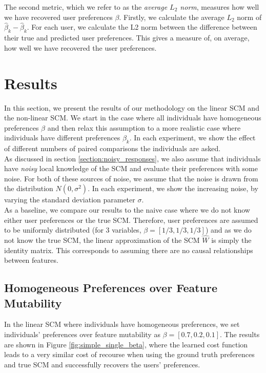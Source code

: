 \bigskip

The second metric, which we refer to as the \textit{average $L_2$ norm}, measures how well we have recovered user preferences $\beta$. Firstly, we calculate the average $L_2$ norm of $\hat{\beta}_k - \hat{\beta}_k$. For each user, we calculate the L2 norm between the difference between their true and predicted user preferences. This gives a measure of, on average, how well we have recovered the user preferences. \\

\section{Results}

In this section, we present the results of our methodology on the linear SCM and the non-linear SCM. We start in the case where all individuals have homogeneous preferences $\beta$ and then relax this assumption to a more realistic case where individuals have different preferences $\beta_k$. In each experiment, we show the effect of different numbers of paired comparisons the individuals are asked. \\

As discussed in section \ref{section:noisy_responses}, we also assume that individuals have \textit{noisy} local knowledge of the SCM and evaluate their preferences with some noise. For both of these sources of noise, we assume that the noise is drawn from the distribution $N(0, \sigma^2)$. In each experiment, we show the increasing noise, by varying the standard deviation parameter $\sigma$. \\

As a baseline, we compare our results to the naive case where we do not know either user preferences or the true SCM. Therefore, user preferences are assumed to be uniformly distributed (for 3 variables, $\beta = [1/3, 1/3, 1/3]$) and as we do not know the true SCM, the linear approximation of the SCM $\hat{W}$ is simply the identity matrix. This corresponds to assuming there are no causal relationships between features.

\subsection{Homogeneous Preferences over Feature Mutability}

In the linear SCM where individuals have homogeneous preferences, we set individuals' preferences over feature mutability as $\beta = [0.7, 0.2, 0.1]$. The results are shown in Figure \ref{fig:simple_single_beta}, where the learned cost function leads to a very similar cost of recourse when using the ground truth preferences and true SCM and successfully recovers the users' preferences.

